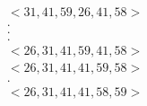 \documentclass{article}
\begin{document}
	\begin{align*}
		<31, 41, 59, 26, 41, 58>\\
		.\\
		.\\
		.\\
		<26, 31, 41, 59, 41, 58>\\
		<26, 31, 41, 41, 59, 58>\\
		.\\
		<26, 31, 41, 41, 58, 59>
	\end{align*}
\end{document}
